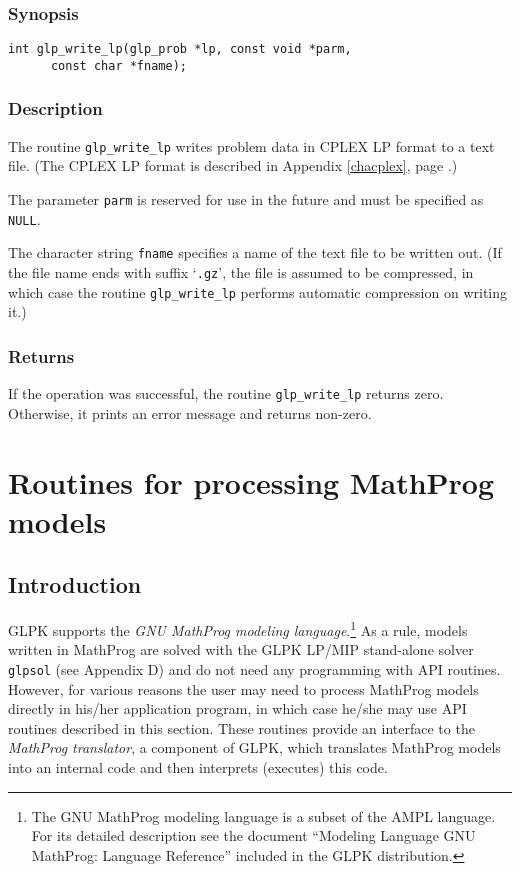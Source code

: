 \subsubsection*{Synopsis}

\begin{verbatim}
int glp_write_lp(glp_prob *lp, const void *parm,
      const char *fname);
\end{verbatim}

\subsubsection*{Description}

The routine \verb|glp_write_lp| writes problem data in CPLEX LP format
to a text file. (The CPLEX LP format is described in Appendix
\ref{chacplex}, page \pageref{chacplex}.)

The parameter \verb|parm| is reserved for use in the future and must be
specified as \verb|NULL|.

The character string \verb|fname| specifies a name of the text file to
be written out. (If the file name ends with suffix `\verb|.gz|', the
file is assumed to be compressed, in which case the routine
\verb|glp_write_lp| performs automatic compression on writing it.)

\subsubsection*{Returns}

If the operation was successful, the routine \verb|glp_write_lp|
returns zero. Otherwise, it prints an error message and returns
non-zero.


\newpage

\section{Routines for processing MathProg models}

\subsection{Introduction}

GLPK supports the {\it GNU MathProg modeling language}.\footnote{The
GNU MathProg modeling language is a subset of the AMPL language. For
its detailed description see the document ``Modeling Language GNU
MathProg: Language Reference'' included in the GLPK distribution.}
As a rule, models written in MathProg are solved with the GLPK LP/MIP
stand-alone solver \verb|glpsol| (see Appendix D) and do not need any
programming with API routines. However, for various reasons the user
may need to process MathProg models directly in his/her application
program, in which case he/she may use API routines described in this
section. These routines provide an interface to the {\it MathProg
translator}, a component of GLPK, which translates MathProg models into
an internal code and then interprets (executes) this code.

